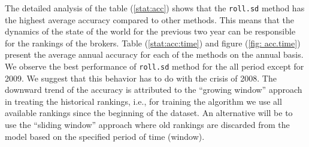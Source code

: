 \documentclass{article}\usepackage[]{graphicx}\usepackage[]{color}
\newcommand{\rollsd}{\texttt{roll.sd}}
\begin{document}
The detailed analysis of the table (\ref{stat:acc}) shows that the \rollsd{} method has the highest average accuracy compared to other methods. This means that the dynamics of the state of the world for the previous two year can be responsible for the rankings of the brokers. Table (\ref{stat:acc:time})  and figure (\ref{fig: acc.time}) present the average annual accuracy for each of the methods on the annual basis. We observe the best performance of \rollsd{} method for the all period except for 2009. We suggest that this behavior has to do with the crisis of 2008. The downward trend of the accuracy is attributed to the ``growing window'' approach in treating the historical rankings, i.e., for training the algorithm we use all available rankings since the beginning of the dataset. An alternative will be to use the ``sliding window'' approach where old rankings are discarded from the model based on the specified period of time (window). 



 


\end{document}
